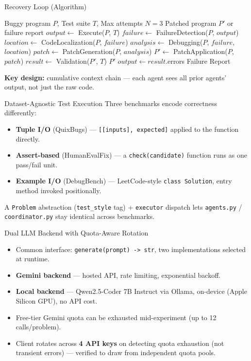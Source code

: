 \documentclass[aspectratio=169]{beamer}
\begin{document}
\begin{frame}{Recovery Loop (Algorithm)}
\begin{algorithm}[H]
\small
\begin{algorithmic}[1]
\REQUIRE Buggy program $P$, Test suite $T$, Max attempts $N=3$
\ENSURE Patched program $P'$ or failure report
\STATE $output \leftarrow$ Execute($P$, $T$)
    \STATE $failure \leftarrow$ FailureDetection($P$, $output$)
    \STATE $location \leftarrow$ CodeLocalization($P$, $failure$)
    \STATE $analysis \leftarrow$ Debugging($P$, $failure$, $location$)
    \STATE $patch \leftarrow$ PatchGeneration($P$, $analysis$)
    \STATE $P' \leftarrow$ PatchApplication($P$, $patch$)
    \STATE $result \leftarrow$ Validation($P'$, $T$)
     \RETURN $P'$
    \ELSE \STATE $output \leftarrow result$.errors 
    \ENDIF
\ENDFOR
\RETURN Failure Report
\end{algorithmic}
\end{algorithm}
\textbf{Key design:} cumulative context chain --- each agent sees all prior agents' output, not just the raw code.
\end{frame}

\begin{frame}{Dataset-Agnostic Test Execution}
Three benchmarks encode correctness differently:
\begin{itemize}
    \item \textbf{Tuple I/O} (QuixBugs) --- \texttt{[[inputs], expected]} applied to the function directly.
    \item \textbf{Assert-based} (HumanEvalFix) --- a \texttt{check(candidate)} function runs as one pass/fail unit.
    \item \textbf{Example I/O} (DebugBench) --- LeetCode-style \texttt{class Solution}, entry method invoked positionally.
\end{itemize}
\vspace{6pt}
A \texttt{Problem} abstraction (\texttt{test\_style} tag) + \texttt{executor} dispatch lets \texttt{agents.py} / \texttt{coordinator.py} stay identical across benchmarks.
\end{frame}

\begin{frame}{Dual LLM Backend with Quota-Aware Rotation}
\begin{itemize}
    \item Common interface: \texttt{generate(prompt) -> str}, two implementations selected at runtime.
    \item \textbf{Gemini backend} --- hosted API, rate limiting, exponential backoff.
    \item \textbf{Local backend} --- Qwen2.5-Coder 7B Instruct via Ollama, on-device (Apple Silicon GPU), no API cost.
    \item Free-tier Gemini quota can be exhausted mid-experiment (up to 12 calls/problem).
    \item Client rotates across \textbf{4 API keys} on detecting quota exhaustion (not transient errors) --- verified to draw from independent quota pools.
\end{itemize}
\end{frame}
\end{document}
